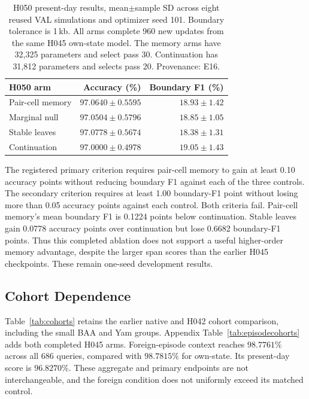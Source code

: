 \documentclass[letterpaper]{article}
\begin{document}
\begin{table}[t]
\centering
\small
\begin{tabular}{@{}lrr@{}}
\toprule
H050 arm & Accuracy (\%) & Boundary F1 (\%) \\
\midrule
Pair-cell memory & $97.0640\pm0.5595$ & $18.93\pm1.42$ \\
Marginal null & $97.0504\pm0.5796$ & $18.85\pm1.05$ \\
Stable leaves & $97.0778\pm0.5674$ & $18.38\pm1.31$ \\
Continuation & $97.0000\pm0.4978$ & $19.05\pm1.43$ \\
\bottomrule
\end{tabular}
\caption{H050 present-day results, mean$\pm$sample SD across eight reused VAL simulations and optimizer seed 101. Boundary tolerance is 1\,kb. All arms complete 960 new updates from the same H045 own-state model. The memory arms have 32,325 parameters and select pass 30. Continuation has 31,812 parameters and selects pass 20. Provenance: E16.}
\label{tab:H050}
\end{table}

The registered primary criterion requires pair-cell memory to gain at least 0.10 accuracy points without reducing boundary F1 against each of the three controls. The secondary criterion requires at least 1.00 boundary-F1 point without losing more than 0.05 accuracy points against each control. Both criteria fail. Pair-cell memory's mean boundary F1 is 0.1224 points below continuation. Stable leaves gain 0.0778 accuracy points over continuation but lose 0.6682 boundary-F1 points. Thus this completed ablation does not support a useful higher-order memory advantage, despite the larger span scores than the earlier H045 checkpoints. These remain one-seed development results.

\subsection{Cohort Dependence}
Table~\ref{tab:cohorts} retains the earlier native and H042 cohort comparison, including the small BAA and Yam groups. Appendix Table~\ref{tab:episodecohorts} adds both completed H045 arms. Foreign-episode context reaches $98.7761\%$ across all 686 queries, compared with $98.7815\%$ for own-state. Its present-day score is $96.8270\%$. These aggregate and primary endpoints are not interchangeable, and the foreign condition does not uniformly exceed its matched control.
\end{document}
